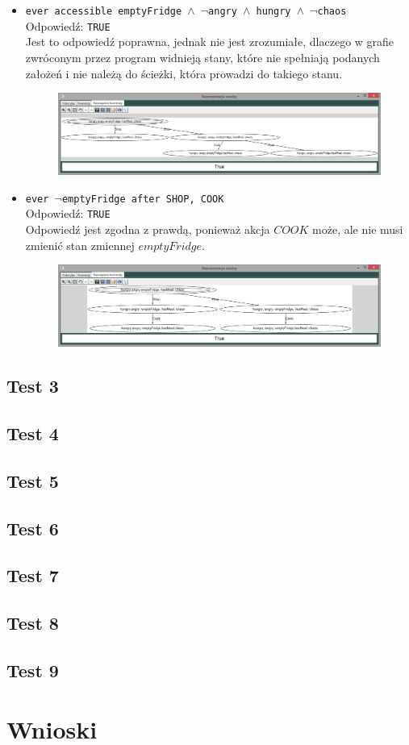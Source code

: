 \documentclass{article}
\begin{document}
\begin{itemize}
\begin{figure}[H]
    \end{figure}
    \item {\large\texttt{ever accessible emptyFridge $\wedge$ $\neg$angry $\wedge$ hungry $\wedge$ $\neg$chaos }}\\
    Odpowiedź: \texttt{TRUE}\\
    Jest to odpowiedź poprawna, jednak nie jest zrozumiałe, dlaczego w grafie zwróconym przez program widnieją stany, które nie spełniają podanych założeń i nie należą do ścieżki, która prowadzi do takiego stanu.
    \begin{figure}[H]
    \centering
    \includegraphics[scale=0.35]{test2_3}
    \end{figure}
    \item {\large\texttt{ever $\neg$emptyFridge after SHOP, COOK}}\\
    Odpowiedź: \texttt{TRUE}\\
    Odpowiedź jest zgodna z prawdą, ponieważ akcja $COOK$ może, ale nie musi zmienić stan zmiennej $emptyFridge$.
    \begin{figure}[H]
    \centering
    \includegraphics[scale=0.35]{test2_4}
    \end{figure}
\end{itemize}

\subsection{Test 3}
\subsection{Test 4}
\subsection{Test 5}
\subsection{Test 6}
\subsection{Test 7}
\subsection{Test 8}
\subsection{Test 9}

\section{Wnioski}
\end{document}
